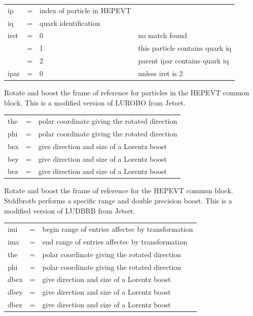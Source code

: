 \begin{description}
\begin{tabular}{lcll}
ip   & = & index of particle in HEPEVT \\
iq   & = & quark identification \\
iret & = & 0 & no match found \\
     & = & 1 & this particle contains quark iq \\
     & = & 2 & parent ipar contains quark iq \\
ipar & = & 0 & unless iret is 2 \\
\end{tabular}

\item[stdrotboost(the,phi,bex,bey,bez)]
 Rotate and boost the frame of reference for particles in the
 \mbox{HEPEVT} common block.
 This is a modified version of LUROBO from Jetset.

\begin{tabular}{lcl}
the  & = & polar coordinate giving the rotated direction \\
phi  & = & polar coordinate giving the rotated direction \\
bex  & = & give direction and size of a Lorentz boost \\
bey  & = & give direction and size of a Lorentz boost \\
bez  & = & give direction and size of a Lorentz boost \\
\end{tabular}

\item[stddbrotb(imi,ima,the,phi,dbex,dbey,dbez)]
 Rotate and boost the frame of reference for the HEPEVT common block.
 Stddbrotb performs a specific range and double precision boost.
 This is a modified version of LUDBRB from Jetset.

\begin{tabular}{lcl}
imi  & = & begin range of entries affectec by transformation \\
ima  & = & end range of entries affectec by transformation \\
the  & = & polar coordinate giving the rotated direction \\
phi  & = & polar coordinate giving the rotated direction \\
dbex & = & give direction and size of a Lorentz boost \\
dbey & = & give direction and size of a Lorentz boost \\
dbez & = & give direction and size of a Lorentz boost \\
\end{tabular}


\end{description}
